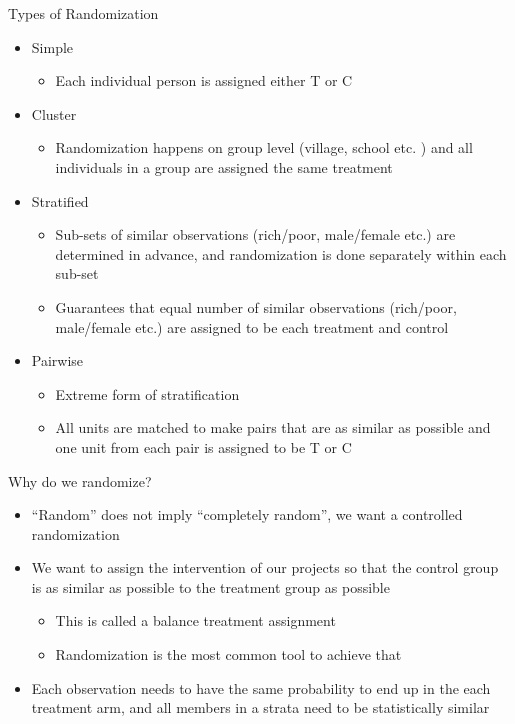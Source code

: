 \documentclass[aspectratio=169]{beamer}
\begin{document}
\begin{frame}{Types of Randomization}
\begin{itemize}
	\item Simple
		\begin{itemize}
			\item 	Each individual person is assigned either T or C
		\end{itemize}
	\item Cluster
		\begin{itemize}
			\item Randomization happens on group level (village, school etc. ) and all individuals in a group are assigned the same treatment
		\end{itemize}
	\item Stratified
			\begin{itemize}
				\item Sub-sets of similar observations (rich/poor, male/female etc.) are determined in advance, and randomization is done separately within each sub-set
				\item Guarantees that equal number of similar observations (rich/poor, male/female etc.) are assigned to be each treatment and control
			\end{itemize}
	\item Pairwise
			\begin{itemize}
				\item Extreme form of stratification
				\item All units are matched to make pairs that are as similar as possible and one unit from each pair is assigned to be T or C
			\end{itemize}
	\end{itemize}
\end{frame}


\begin{frame}{Why do we randomize?}
\begin{itemize}
	\item “Random” does not imply “completely random”, we want a controlled randomization
	\item We want to assign the intervention of our projects so that the control group is as similar as possible to the treatment group as possible
		\begin{itemize}
			\item This is called a balance treatment assignment
			\item Randomization is the most common tool to achieve that
		\end{itemize}
	\item Each observation needs to have the same probability to end up in the each treatment arm, and all members in a strata need to be statistically similar
\end{itemize}
\end{frame}
\end{document}
